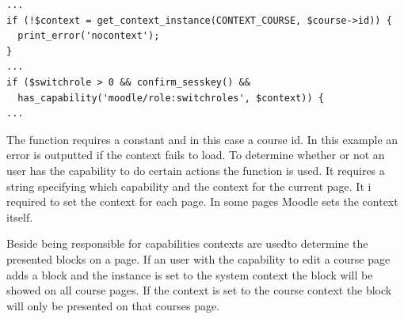 \begin{lstlisting}[style=phpCode, caption=\myCaption{A snippet from \moodlefile{/course/view.php}}, label=courseviewcontextsnippet]
...
if (!$context = get_context_instance(CONTEXT_COURSE, $course->id)) {
  print_error('nocontext');
}
...
if ($switchrole > 0 && confirm_sesskey() &&
  has_capability('moodle/role:switchroles', $context)) {
...	
\end{lstlisting}
The function  requires a constant and in this case a course id. 
In this example an error is outputted if the context fails to load. 
To determine whether or not an user has the capability to do certain actions the function  is used. It requires a string specifying which capability and the context for the current page. 
It i required to set the context for each page. 
In some pages Moodle sets the context itself. 

Beside being responsible for capabilities contexts are usedto determine the presented blocks on a page. If an user with the capability to edit a course page adds a block and the instance is set to the system context the block will be showed on all course pages. If the context is set to the course context the block will only be presented on that courses page. 

	
	
	